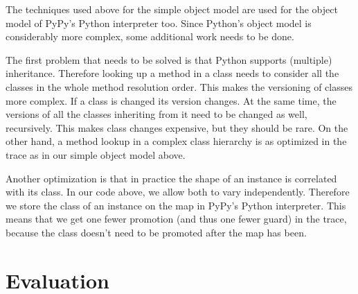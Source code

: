 \documentclass{sigplanconf}
\newcommand\eg{e.g.,\xspace}
\begin{document}
The techniques used above for the simple object model are used for the object
model of PyPy's Python interpreter too. Since Python's object model is
considerably more complex, some additional work needs to be done.

The first problem that needs to be solved is that Python supports (multiple)
inheritance. Therefore looking up a method in a class needs to consider all the
classes in the
whole method resolution order. This makes the versioning of classes more
complex. If a class is changed its version changes. At the same time, the
versions of all the classes inheriting from it need to be changed as well,
recursively. This makes class changes expensive, but they should be rare.  On the
other hand, a method lookup in a complex class hierarchy is as optimized in the
trace as in our simple object model above.

Another optimization is that in practice the shape of an instance is correlated
with its class. In our code above, we allow both to vary independently.
Therefore we store the class of an instance on the map in PyPy's Python
interpreter. This means that we get one fewer promotion (and thus one fewer
guard) in the trace, because the class doesn't need to be promoted after the
map has been.



%
%




\section{Evaluation}
\label{sec:evaluation}
\end{document}

